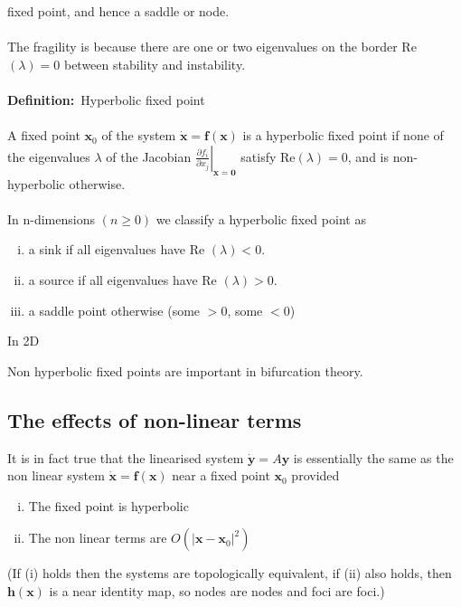 \documentclass{article}
\newcommand{\definition}{\textbf{Definition:}}              %
\newcommand{\pder}[2] {\frac{\partial {#1}}{\partial {#2} }}%
\begin{document}
fixed point, and hence a saddle or node.
\\
\\
The fragility is because there are one or two eigenvalues on the border
Re$(\lambda) = 0$ between stability and instability.
\\
\\
\definition\ Hyperbolic fixed point
\\
\\
A fixed point $\bm{x}_0$ of the system $\dot{\bm{x}} = \bm{f}(\bm{x})$ is a
hyperbolic fixed point if none of the eigenvalues $\lambda$ of the Jacobian
$\displaystyle \left. \pder{f_i}{x_j} \right| _{\bm{x} = \bm{0}} $ satisfy
Re$(\lambda) = 0$, and is non-hyperbolic otherwise.
\\
\\
In n-dimensions $(n \geq 0)$ we classify a hyperbolic fixed point as
\begin{enumerate}[(i)]
\item a sink if all eigenvalues have Re $(\lambda) < 0$.
\item a source if all eigenvalues have Re $(\lambda) > 0$.
\item a saddle point otherwise (some $>0$, some $<0$)
\end{enumerate}
In 2D
\begin{center}
\end{center}
Non hyperbolic fixed points are important in bifurcation theory.
\\
\subsection{The effects of non-linear terms}
It is in fact true that the linearised system $\dot{\bm{y}} = A \bm{y}$
is essentially the same as the non linear system $\dot{\bm{x}} = \bm{f}(\bm{x})$
near a fixed point $\bm{x}_0$ provided
\begin{enumerate}[(i)]
\item The fixed point is hyperbolic
\item The non linear terms are $O( |\bm{x} - \bm{x}_0|^2)$
\end{enumerate}
(If (i) holds then the systems are topologically equivalent, if (ii) also holds,
then $\bm{h}(\bm{x})$ is a near identity map, so nodes are nodes and foci are
foci.)
\end{document}
